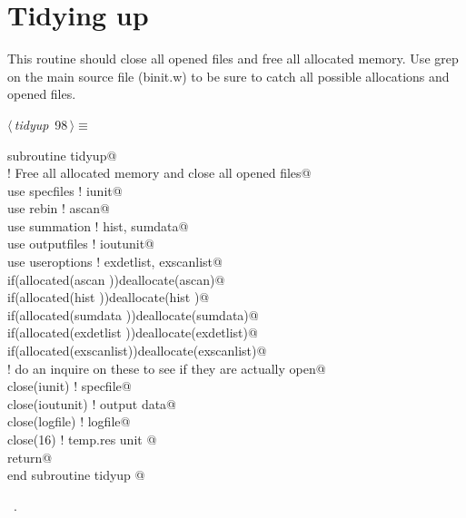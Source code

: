\documentclass[10pt,a4paper,notitlepage]{article}
\begin{document}
\section{Tidying up}
\label{sec:tidy}
This routine should close all opened files and free all allocated memory.
Use grep on the main source file (binit.w) to be sure to catch all 
possible allocations and opened files.
\begin{flushleft} \small
\begin{minipage}{\linewidth}\label{scrap120}\raggedright\small
{} $\langle\,${\it tidyup}\nobreak\ {\footnotesize {98}}$\,\rangle\equiv$
\vspace{-1ex}
\begin{list}{}{} \item
\mbox{}\verb@      subroutine tidyup@\\
\mbox{}\verb@! Free all allocated memory and close all opened files@\\
\mbox{}\verb@      use specfiles    ! iunit@\\
\mbox{}\verb@      use rebin        ! ascan@\\
\mbox{}\verb@      use summation    ! hist, sumdata@\\
\mbox{}\verb@      use outputfiles  ! ioutunit@\\
\mbox{}\verb@      use useroptions  ! exdetlist, exscanlist@\\
\mbox{}\verb@      if(allocated(ascan     ))deallocate(ascan)@\\
\mbox{}\verb@      if(allocated(hist      ))deallocate(hist )@\\
\mbox{}\verb@      if(allocated(sumdata   ))deallocate(sumdata)@\\
\mbox{}\verb@      if(allocated(exdetlist ))deallocate(exdetlist)@\\
\mbox{}\verb@      if(allocated(exscanlist))deallocate(exscanlist)@\\
\mbox{}\verb@! do an inquire on these to see if they are actually open@\\
\mbox{}\verb@      close(iunit)    ! specfile@\\
\mbox{}\verb@      close(ioutunit) ! output data@\\
\mbox{}\verb@      close(logfile)  ! logfile@\\
\mbox{}\verb@      close(16) ! temp.res unit @\\
\mbox{}\verb@      return@\\
\mbox{}\verb@      end subroutine tidyup                                                  @{\NWsep}
\end{list}
\vspace{-1.5ex}
\footnotesize
\begin{list}{}{\setlength{\itemsep}{-\parsep}\setlength{\itemindent}{-\leftmargin}}
\item \NWtxtMacroRefIn\ .

\item{}
\end{list}
\end{minipage}\vspace{4ex}
\end{flushleft}
\end{document}
